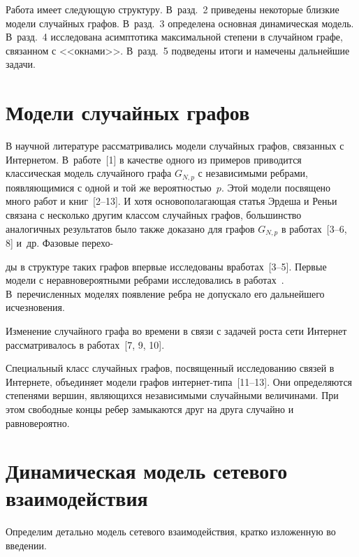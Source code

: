 \begin{multicols}{2}
     Работа имеет следующую структуру. В~разд.~2 приведены некоторые близкие 
модели случайных графов. В~разд.~3 определена основная динамическая модель. 
В~разд.~4 исследована асимптотика максимальной степени в случайном графе, связанном 
с <<окнами>>. В~разд.~5 подведены итоги и намечены дальнейшие задачи. 
     
\section{Модели случайных графов}
     
     В научной литературе рассматривались модели случайных графов, связанных с 
Интернетом. В~работе~[1] в качестве одного из примеров приводится классическая 
модель случайного графа $G_{N,p}$ с независимыми ребрами, появляющимися с одной и 
той же вероятностью~$p$. Этой модели посвящено много работ и книг~[2--13]. И хотя 
осново\-по\-ла\-га\-ющая \mbox{статья} Эрдеша и Реньи~\cite{2-gr} связана с несколько другим классом 
случайных графов, большинство аналогичных результатов было также доказано для 
графов $G_{N,p}$ в работах~[3--6, 8] и~др. Фазовые перехо-\linebreak\vspace*{-12pt}

\pagebreak

\noindent
ды в структуре таких графов 
впервые исследованы в\linebreak работах~[3--5]. Первые модели с неравновероятными ребрами 
исследовались в работах~\cite{7-gr}. В~пе\-ре\-чис\-лен\-ных моделях появление ребра не 
допускало его дальнейшего исчезновения.
     
     Изменение случайного графа во времени в связи с задачей роста сети Интернет 
рассматривалось в работах~[7, 9, 10]. 
     
     Специальный класс случайных графов, посвященный исследованию связей в 
Интернете, объединяет модели графов ин\-тер\-нет-типа~[11--13]. Они определяются 
степенями вершин, являющихся независимыми случайными величинами. При этом 
свободные концы ребер замыкаются друг на друга случайно и равновероятно. 
     
\section{Динамическая модель сетевого взаимодействия}
     
     Определим детально модель сетевого взаимодействия, кратко изложенную во 
введении. 
     

\end{multicols}
